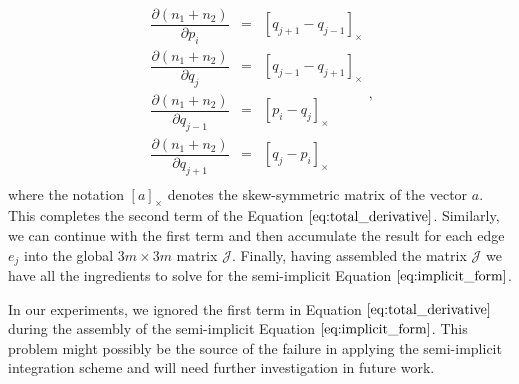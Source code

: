 \documentclass[11pt]{article}
\begin{document}
\begin{appendices}
\begin{equation}
\begin{array}{rcl} 
\dfrac{\partial (n_1+n_2)}{\partial p_i} & = & \left[ q_{j+1} - q_{j-1} \right]_{\times} \\ 
\dfrac{\partial (n_1+n_2)}{\partial q_j} & = & \left[ q_{j-1} - q_{j+1} \right]_{\times} \\
\dfrac{\partial (n_1+n_2)}{\partial q_{j-1}} & = & \left[ p_{i} - q_{j} \right]_{\times} \\
\dfrac{\partial (n_1+n_2)}{\partial q_{j+1}} & = & \left[ q_{j} - p_{i} \right]_{\times} \\
\end{array},
\end{equation}
where the notation $\left[ a \right]_{\times} $ denotes the skew-symmetric matrix of the vector $a$. This completes the second term of the Equation $\ref{eq:total_derivative}$. Similarly, we can continue with the first term and then accumulate the result for each edge $e_j$ into the global $3m \times 3m$ matrix $\mathcal{J}$. Finally, having assembled the matrix $\mathcal{J}$ we have all the ingredients to solve for the semi-implicit Equation $\ref{eq:implicit_form}$.

In our experiments, we ignored the first term in Equation $\ref{eq:total_derivative}$ during the assembly of the semi-implicit Equation $\ref{eq:implicit_form}$. This problem might possibly be the source of the failure in applying the semi-implicit integration scheme and will need further investigation in future work.

\end{appendices}
\end{document}

